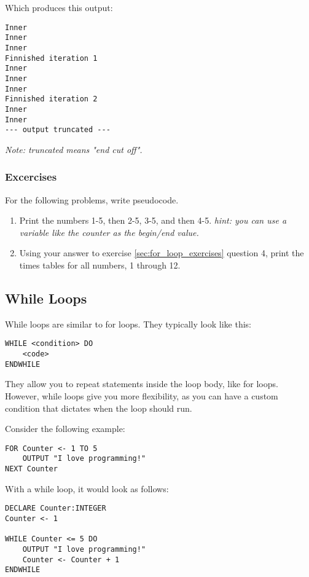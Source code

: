 \documentclass[./main.tex]{subfiles}
\begin{document}
Which produces this output:

\begin{verbatim}
Inner
Inner
Inner
Finnished iteration 1
Inner
Inner
Inner
Finnished iteration 2
Inner
Inner
--- output truncated ---
\end{verbatim}
\emph{Note: truncated means "end cut off".}

\newpage
\subsubsection{Excercises}

For the following problems, write pseudocode.

\begin{enumerate}
    \item Print the numbers 1-5, then 2-5, 3-5, and then 4-5. \emph{hint: you can use a variable like the counter as the begin/end value.}
        \mediumlines

    \item Using your answer to exercise \ref{sec:for_loop_exercises} question 4, print the times tables for all numbers, 1 through 12.
        \mediumlines
\end{enumerate}

\newpage
\subsection{While Loops}

While loops are similar to for loops. They typically look like this:

\begin{verbatim}
WHILE <condition> DO
    <code>
ENDWHILE
\end{verbatim}

They allow you to repeat statements inside the loop body, like for loops. However, while loops give you more flexibility, as you can have a custom condition that dictates when the loop should run.

Consider the following example:

\begin{verbatim}
FOR Counter <- 1 TO 5
    OUTPUT "I love programming!"
NEXT Counter
\end{verbatim}

With a while loop, it would look as follows:

\begin{verbatim}
DECLARE Counter:INTEGER
Counter <- 1

WHILE Counter <= 5 DO
    OUTPUT "I love programming!"
    Counter <- Counter + 1
ENDWHILE
\end{verbatim}
\end{document}
